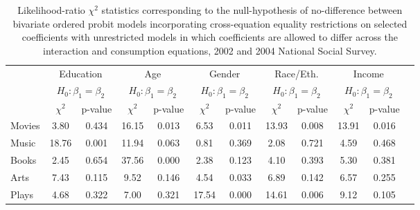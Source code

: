 \documentclass[11pt]{article}
\begin{document}
\begin{landscape}
\begin{table}[htb!]
\caption{\footnotesize Likelihood-ratio $\chi^{2}$ statistics corresponding to the null-hypothesis of no-difference between bivariate ordered probit models incorporating cross-equation equality restrictions on selected coefficients with unrestricted models in which coefficients are allowed to differ across the interaction and consumption equations, 2002 and 2004 National Social Survey.}
\small
\begin{tabular*}{\hsize}{@{\extracolsep{\fill}} l*{11}{c}} 
\hline 
\hline 
&\multicolumn{2}{c}{Education}&\multicolumn{2}{c}{Age}&\multicolumn{2}{c}{Gender}&\multicolumn{2}{c}{Race/Eth.}&\multicolumn{2}{c}{Income}\\
&\multicolumn{2}{c}{$H_{0}: \beta_{1}=\beta_{2}$}&\multicolumn{2}{c}{$H_{0}: \beta_{1}=\beta_{2}$}&\multicolumn{2}{c}{$H_{0}: \beta_{1}=\beta_{2}$}&\multicolumn{2}{c}{$H_{0}:  \beta_{1}=\beta_{2}$}&\multicolumn{2}{c}{$H_{0}: \beta_{1}=\beta_{2}$}\\
&$\chi^{2}$&p-value&$\chi^{2}$&p-value&$\chi^{2}$&p-value&$\chi^{2}$&p-value&$\chi^{2}$&p-value\\
\hline 
Movies&3.80&0.434&16.15&0.013&6.53&0.011&13.93&0.008&13.91&0.016\\
Music&18.76&0.001&11.94&0.063&0.81&0.369&2.08&0.721&4.59&0.468\\
Books&2.45&0.654&37.56&0.000&2.38&0.123&4.10&0.393&5.30&0.381\\
Arts&7.43&0.115&9.52&0.146&4.54&0.033&6.89&0.142&6.57&0.255\\
Plays&4.68&0.322&7.00&0.321&17.54&0.000&14.61&0.006&9.12&0.105\\
\hline 
\end{tabular*}
\label{tab3}
\end{table}
\end{landscape}
\end{document}
